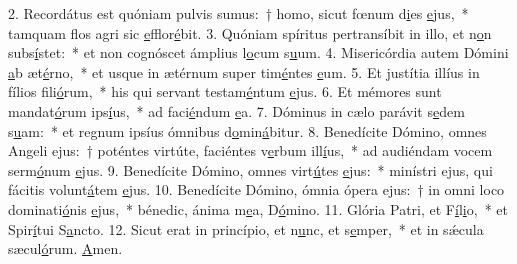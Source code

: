 2. Recordátus est quóniam pulvis sumus:~† homo, sicut fœnum d\uline{i}es \uline{e}jus,~* tamquam flos agri sic \uline{e}fflor\uline{é}bit.
3. Quóniam spíritus pertransíbit in illo, et n\uline{o}n subs\uline{í}stet:~* et non cognóscet ámplius l\uline{o}cum s\uline{u}um.
4. Misericórdia autem Dómini \uline{a}b æt\uline{é}rno,~* et usque in ætérnum super tim\uline{é}ntes \uline{e}um.
5. Et justítia illíus in fílios f\uline{i}li\uline{ó}rum,~* his qui servant testam\uline{é}ntum \uline{e}jus.
6. Et mémores sunt mandat\uline{ó}rum ips\uline{í}us,~* ad faci\uline{é}ndum \uline{e}a.
7. Dóminus in cælo parávit s\uline{e}dem s\uline{u}am:~* et regnum ipsíus ómnibus d\uline{o}min\uline{á}bitur.
8. Benedícite Dómino, omnes Angeli ejus:~† poténtes virtúte, faciéntes v\uline{e}rbum ill\uline{í}us,~* ad audiéndam vocem serm\uline{ó}num \uline{e}jus.
9. Benedícite Dómino, omnes virt\uline{ú}tes \uline{e}jus:~* minístri ejus, qui fácitis volunt\uline{á}tem \uline{e}jus.
10. Benedícite Dómino, ómnia ópera ejus:~† in omni loco dominati\uline{ó}nis \uline{e}jus,~* bénedic, ánima m\uline{e}a, D\uline{ó}mino.
11. Glória Patri, et F\uline{í}l\uline{i}o,~* et Spir\uline{í}tui S\uline{a}ncto.
12. Sicut erat in princípio, et n\uline{u}nc, et s\uline{e}mper,~* et in sǽcula sæcul\uline{ó}rum. \uline{A}men.
